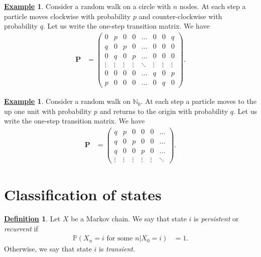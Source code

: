 \documentclass[12pt]{book}
\numberwithin{equation}{chapter}
\theoremstyle{plain}
\numberwithin{theorem}{section}
\theoremstyle{definition}
\newtheorem{definition}[theorem]{\underline{Definition}}
\newtheorem{example}[theorem]{\underline{Example}}
\numberwithin{exercise}{chapter}
\newcommand{\<}{\langle}
\renewcommand{\>}{\rangle}
\renewcommand{\(}{\left(}
\renewcommand{\)}{\right)}
\renewcommand{\[}{\left[}
\renewcommand{\]}{\right]}
\newcommand\Pb{\mathds{P}}
\newcommand\Nb{\mathds{N}}
\newcommand\Pv{\pmb{P}}
\begin{document}
\begin{example}
Consider a random walk on a circle with $n$ nodes.  At each step a particle moves clockwise with probability $p$ and counter-clockwise with probability $q$.  Let us write the one-step transition matrix.  We have
\begin{align}
\Pv
	&=	\( \begin{array}{cccccccc}
			0	& p & 0 & 0 & \ldots & 0 & 0 & q \\
			q	& 0 & p & 0 & \ldots & 0 & 0 & 0 \\
			0	& q & 0 & p & \ldots & 0 & 0 & 0 \\
			\vdots & \vdots & \vdots & \vdots & \ddots & \vdots & \vdots & \vdots \\
			0	& 0 & 0 & 0 & \ldots & q & 0 & p \\
			p	& 0 & 0 & 0 & \ldots & 0 & q & 0 
			\end{array} \) .
\end{align}
\end{example}

\begin{example}
Consider a random walk on $\Nb_0$.  At each step a particle moves to the up one unit with probability $p$ and returns to the origin with probability $q$.  Let us write the one-step transition matrix.  We have
\begin{align}
\Pv
	&=	\( \begin{array}{cccccc}
			q & p & 0 & 0 & 0 & \ldots \\
			q & 0 & p & 0 & 0 & \ldots \\
			q & 0 & 0 & p & 0 & \ldots \\
			\vdots  & \vdots & \vdots & \vdots & \vdots & \ddots 
			\end{array} \) .
\end{align}
\end{example}


\section{Classification of states}
\label{sec:state.classification}

\begin{definition}
\label{def:persistent}
Let $X$ be a Markov chain.  We say that state $i$ is \emph{persistent} or \emph{recurrent} if
\begin{align}
\Pb( X_n = i \text{ for some } n | X_0 = i )
	&=	1 .
\end{align}
Otherwise, we say that state $i$ is \emph{transient}.
\end{definition}
\end{document}
